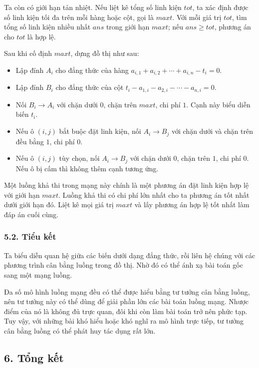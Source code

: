 \documentclass[11pt]{article}
\begin{document}
Ta còn có giới hạn tản nhiệt. Nếu liệt kê tổng số linh kiện \(tot\), ta xác
định được số linh kiện tối đa trên mỗi hàng hoặc cột, gọi là \(maxt\). Với
mỗi giá trị \(tot\), tìm tổng số linh kiện nhiều nhất \(ans\) trong giới hạn
\(maxt\); nếu \(ans\ge tot\), phương án cho \(tot\) là hợp lệ.

Sau khi cố định \(maxt\), dựng đồ thị như sau:
\begin{itemize}
  \item Lập đỉnh \(A_i\) cho đẳng thức của hàng
  \(a_{i,1}+a_{i,2}+\cdots+a_{i,n}-t_i=0\).
  \item Lập đỉnh \(B_i\) cho đẳng thức của cột
  \(t_i-a_{1,i}-a_{2,i}-\cdots-a_{n,i}=0\).
  \item Nối \(B_i\to A_i\) với chặn dưới \(0\), chặn trên \(maxt\), chi phí
  \(1\). Cạnh này biểu diễn biến \(t_i\).
  \item Nếu ô \((i,j)\) bắt buộc đặt linh kiện, nối \(A_i\to B_j\) với chặn
  dưới và chặn trên đều bằng \(1\), chi phí \(0\).
  \item Nếu ô \((i,j)\) tùy chọn, nối \(A_i\to B_j\) với chặn dưới \(0\),
  chặn trên \(1\), chi phí \(0\). Nếu ô bị cấm thì không thêm cạnh tương ứng.
\end{itemize}

Một luồng khả thi trong mạng này chính là một phương án đặt linh kiện hợp lệ
với giới hạn \(maxt\). Luồng khả thi có chi phí lớn nhất cho ta phương án tốt
nhất dưới giới hạn đó. Liệt kê mọi giá trị \(maxt\) và lấy phương án hợp lệ
tốt nhất làm đáp án cuối cùng.

\subsubsection*{5.2. Tiểu kết}

Ta biểu diễn quan hệ giữa các biến dưới dạng đẳng thức, rồi liên hệ chúng với
các phương trình cân bằng luồng trong đồ thị. Nhờ đó có thể ánh xạ bài toán
gốc sang một mạng luồng.

Đa số mô hình luồng mạng đều có thể được hiểu bằng tư tưởng cân bằng luồng,
nên tư tưởng này có thể dùng để giải phần lớn các bài toán luồng mạng. Nhược
điểm của nó là không đủ trực quan, đôi khi còn làm bài toán trở nên phức tạp.
Tuy vậy, với những bài khó hiểu hoặc khó nghĩ ra mô hình trực tiếp, tư tưởng
cân bằng luồng có thể phát huy tác dụng rất lớn.

\subsection*{6. Tổng kết}
\end{document}
